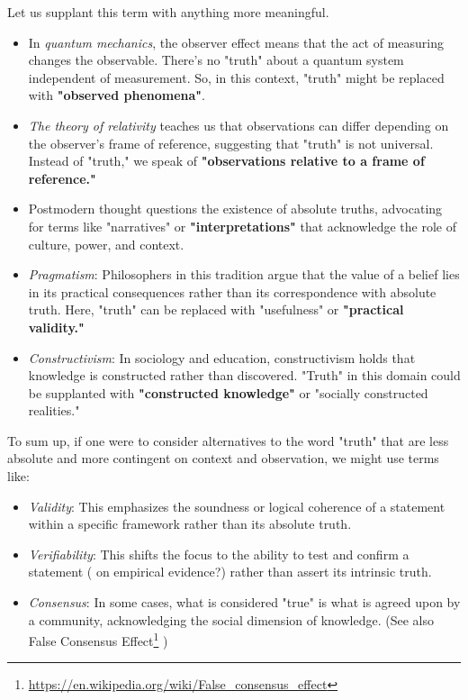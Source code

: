 \documentclass[11pt,a4]{article}
\begin{document}
    Let us supplant this term with anything more meaningful.

    \begin{itemize}

        \item In \textit{quantum mechanics}, the observer effect means that the act of measuring changes the observable. There's no "truth" about a quantum system independent of measurement. So, in this context, "truth" might be replaced with \textbf{"observed phenomena"}.
        \item \textit{The theory of relativity} teaches us that observations can differ depending on the observer's frame of reference, suggesting that "truth" is not universal. Instead of "truth," we speak of \textbf{"observations relative to a frame of reference."}
        \item Postmodern thought questions the existence of absolute truths, advocating for terms like "narratives" or \textbf{"interpretations"} that acknowledge the role of culture, power, and context.
        \item \textit{Pragmatism}: Philosophers in this tradition argue that the value of a belief lies in its practical consequences rather than its correspondence with absolute truth. Here, "truth" can be replaced with "usefulness" or \textbf{"practical validity."}
        \item \textit{Constructivism}: In sociology and education, constructivism holds that knowledge is constructed rather than discovered. "Truth" in this domain could be supplanted with \textbf{"constructed knowledge"} or "socially constructed realities."
    \end{itemize}

    To sum up, if one were to consider alternatives to the word "truth" that are less absolute and more contingent on context and observation, we might use terms like:

    \begin{itemize}
        \item \textit{Validity}: This emphasizes the soundness or logical coherence of a statement within a specific framework rather than its absolute truth.
        \item \textit{Verifiability}: This shifts the focus to the ability to test and confirm a statement ( on empirical evidence?) rather than assert its intrinsic truth.
        \item \textit{Consensus}: In some cases, what is considered "true" is what is agreed upon by a community, acknowledging the social dimension of knowledge.
        (See also False Consensus Effect\footnote{\url{https://en.wikipedia.org/wiki/False_consensus_effect} } )

    \end{itemize}
\end{document}
